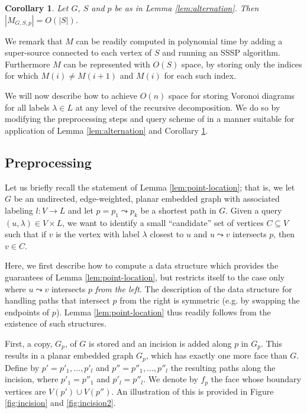 \documentclass[a4paper,UKenglish,cleveref, autoref, thm-restate]{article}
\newtheorem{corollary}{Corollary}
\begin{document}
\begin{corollary}\label{cor:interval-bound}
Let $G$, $S$ and $p$ be as in Lemma \ref{lem:alternation}. Then $|M_{G,S,p}|=O(|S|)$.
\end{corollary}

We remark that $M$ can be readily computed in polynomial time by adding a super-source connected to each vertex of $S$ and running an SSSP algorithm. Furthermore $M$ can be represented with $O(S)$ space, by storing only the indices for which $M(i) \neq M(i+1)$ and $M(i)$ for each such index. 

We will now describe how to achieve $O(n)$ space for storing Voronoi diagrams for all labels $\lambda \in L$ at any level of the recursive decomposition. We do so by modifying the preprocessing steps and query scheme of \cite{Gawrychowski2018} in a manner suitable for application of Lemma \ref{lem:alternation} and Corollary \ref{cor:interval-bound}.

\subsection{Preprocessing}
Let us briefly recall the statement of Lemma \ref{lem:point-location}; that is, we let $G$ be an undirected, edge-weighted, planar embedded graph with associated labeling $l : V \rightarrow L$ and let $p=p_1 \leadsto p_k$ be a shortest path in $G$. Given a query $(u,\lambda) \in V \times L$, we want to identify a small ``candidate'' set of vertices $C \subseteq V$ such that if $v$ is the vertex with label $\lambda$ closest to $u$ and $u \leadsto v$ intersects $p$, then $v \in C$.

Here, we first describe how to compute a data structure which provides the guarantees of Lemma \ref{lem:point-location}, but restricts itself to the case only where $u \leadsto v$ intersects $p$ \textit{from the left}. The description of the data structure for handling paths that intersect $p$ from the right is symmetric (e.g. by swapping the endpoints of $p$). Lemma \ref{lem:point-location} thus readily follows from the existence of such structures. 

First, a copy, $G_p$, of $G$ is stored and an incision is added along $p$ in $G_p$. This results in a planar embedded graph $G_p$, which has exactly one more face than $G$. Define by $p'=p'_1, \hdots, p'_l$ and $p''=p''_1, \hdots, p''_l$ the resulting paths along the incision, where $p'_1 = p''_1$ and $p'_l = p''_l$. We denote by $f_p$ the face whose boundary vertices are $V(p') \cup V(p'')$. An illustration of this is provided in Figure \ref{fig:incision} and \ref{fig:incision2}.
\end{document}
